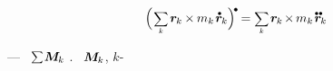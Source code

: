 {%
\hspace*{3.3em}
\\[-0.5em]
}

\nopagebreak\vspace{-0.4em}
\begin{equation}\label{balanceofangularmomentum.thesumofmoments.discretepoints}
\Bigl( \hspace{.2ex} \scalebox{.8}{$ \displaystyle \sum_{\smash{k}} $} \hspace{.3ex} \locationvector_{\hspace{-0.1ex}k} \hspace{-0.1ex} \times \hspace{-0.1ex} m_k \hspace{.2ex} \mathdotabove{\locationvector}_{\hspace{-0.1ex}k}
\Bigr)^{\hspace{-0.1em}\tikz[baseline=-0.2ex]\draw[black, fill=black] (0,0) circle (.28ex);} \hspace{-0.15ex}
= \scalebox{.8}{$ \displaystyle\sum_{\smash{k}} $} \hspace{.25ex} \locationvector_{\hspace{-0.1ex}k} \hspace{-0.25ex} \times \hspace{-0.2ex} m_k \hspace{.2ex} \mathdotdotabove{\locationvector}_{\hspace{-0.1ex}k}
\end{equation}

\vspace{-0.6em}\noindent
\:---
~${\raisebox{.1em}{\scalebox{.66}{$ \displaystyle \sum $}} \hspace{.2ex} \bm{M}_{\hspace{-0.1ex}k}}$
.
~${\bm{M}_{\hspace{-0.1ex}k}}$,
$k$\hbox{-}

